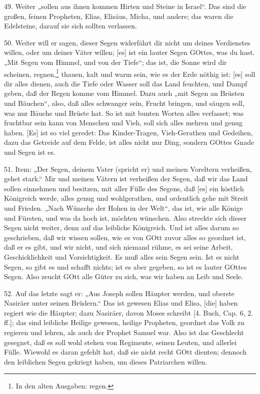 49. Weiter „sollen aus ihnen kommen Hirten und Steine in Israel“. Das sind die großen, feinen Propheten, Elias, Elisäus, Micha, und andere; das waren die Edelsteine, darauf sie sich sollten verlassen.

50. Weiter will er sagen, dieser Segen widerfährt dir nicht um deines Verdienstes willen, oder um deiner Väter willen; [es] ist ein lauter Segen GOttes, was du hast. „Mit Segen vom Himmel, und von der Tiefe“; das ist, die Sonne wird dir scheinen, regnen,\footnote{In den alten Ausgaben: regen.} thauen, kalt und warm sein, wie es der Erde nöthig ist: [es] soll dir alles dienen, auch die Tiefe oder Wasser soll
das Land feuchten, und Dampf geben, daß der Regen komme vom Himmel. Dazu auch „mit Segen an Brüsten und Bäuchen“, also, daß alles schwanger sein, Frucht bringen, und säugen soll, was nur Bäuche und Brüste hat. So ist mit bunten Worten alles verfasset; was fruchtbar sein kann von Menschen und Vieh, soll sich alles mehren und genug haben. [Es] ist so viel geredet: Das Kinder-Tragen, Vieh-Gerathen und Gedeihen, dazu das Getreide auf dem Felde, ist alles nicht nur Ding, sondern GOttes Gnade und Segen ist es.

51. Item: „Der Segen, deinem Vater (spricht er) und meinen Voreltern verheißen, gehet stark.“ Mir und meinen Vätern ist verheißen der Segen, daß wir das Land sollen einnehmen und besitzen, mit aller Fülle des Segens, daß [es] ein köstlich Königreich werde, alles genug und wohlgerathen, und ordentlich gehe mit Streit und Frieden. „Nach Wünsche der Hohen in der Welt“, das ist, wie alle Könige und Fürsten, und was da hoch ist, möchten wünschen. Also streckte sich dieser Segen nicht weiter, denn auf das leibliche Königreich. Und ist alles darum so geschrieben, daß wir wissen sollen, wie es von GOtt zuvor alles so geordnet ist, daß er es gibt, und wir nicht, und sich niemand rühme, es sei seine Arbeit, Geschicklichkeit und Vorsichtigkeit. Es muß alles sein Segen sein. Ist es nicht Segen, so gibt es und schafft nichts; ist es aber gegeben, so ist es lauter GOttes Segen. Also zeucht GOtt alle Güter zu sich, was wir haben an Leib und Seele.

52. Auf das letzte sagt er: „Aus Joseph sollen Häupter werden, und oberste Nasiräer unter seinen Brüdern.“ Das ist gewesen Elias und Elisa, [die] haben regiert wie die Häupter; dazu Nasiräer, davon Moses schreibt [4. Buch, Cap. 6, 2. ff.]; das sind leibliche Heilige gewesen, heilige Propheten, geordnet das Volk zu regieren und lehren, als auch der Prophet Samuel war. Also ist das Geschlecht gesegnet, daß es soll wohl stehen von Regimente, seinen Leuten, und allerlei Fülle. Wiewohl es daran gefehlt hat, daß sie nicht recht GOtt dienten; dennoch den leiblichen Segen gekriegt haben, um dieses Patriarchen willen.

